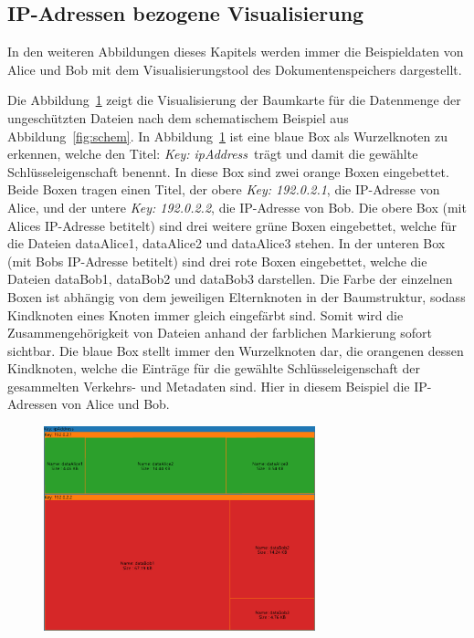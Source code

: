 \documentclass[
    fontsize=12pt,
    headings=small,
    parskip=half,           %
    bibliography=totoc,
    numbers=noenddot,       %
    open=any,               %
    ]{scrreprt}
\begin{document}
\subsection{IP-Adressen bezogene Visualisierung} \label{ipVis}

In den weiteren Abbildungen dieses Kapitels werden immer die Beispieldaten von Alice und Bob mit dem Visualisierungstool des Dokumentenspeichers dargestellt.

Die Abbildung~\ref{fig:ungIpTM} zeigt die Visualisierung der Baumkarte für die Datenmenge der ungeschützten Dateien nach dem schematischem Beispiel aus Abbildung~\ref{fig:schem}. 
In Abbildung~\ref{fig:ungIpTM} ist eine blaue Box als Wurzelknoten zu erkennen, welche den Titel: \glqq \textit{Key: ipAddress}\grqq ~trägt und damit die gewählte Schlüsseleigenschaft benennt.
In diese Box sind zwei orange Boxen eingebettet.
Beide Boxen tragen einen Titel, der obere \glqq \textit{Key: 192.0.2.1}\grqq, die IP-Adresse von Alice, und der untere \glqq \textit{Key: 192.0.2.2}\grqq, die IP-Adresse von Bob.
Die obere Box (mit Alices IP-Adresse betitelt) sind drei weitere grüne Boxen eingebettet, welche für die Dateien dataAlice1, dataAlice2 und dataAlice3 stehen.
In der unteren Box (mit Bobs IP-Adresse betitelt) sind drei rote Boxen eingebettet, welche die Dateien dataBob1, dataBob2 und dataBob3 darstellen.
Die Farbe der einzelnen Boxen ist abhängig von dem jeweiligen Elternknoten in der Baumstruktur, sodass Kindknoten eines Knoten immer gleich eingefärbt sind.
Somit wird die Zusammengehörigkeit von Dateien anhand der farblichen Markierung sofort sichtbar.
Die blaue Box stellt immer den Wurzelknoten dar, die orangenen dessen Kindknoten, welche die Einträge für die gewählte Schlüsseleigenschaft der gesammelten Verkehrs- und Metadaten sind.
Hier in diesem Beispiel die IP-Adressen von Alice und Bob.

\begin{figure}[H]
\includegraphics[width=0.7\textwidth]{../pic/vec/IP-Proxy-SetA-tree3.png}
\label{fig:ungIpTM}
\end{figure}
\end{document}
